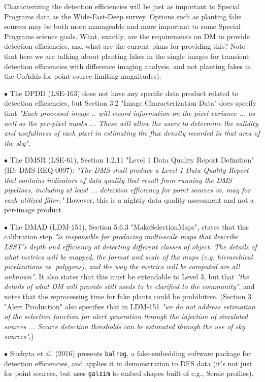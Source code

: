 \documentclass[DM,lsstdraft,toc]{lsstdoc}
\begin{document}
Characterizing the detection efficiencies will be just as important to Special Programs data as the Wide-Fast-Deep survey. Options such as planting fake sources may be both more manageable and more important to some Special Programs science goals. What, exactly, are the requirements on DM to provide detection efficiencies, and what are the current plans for providing this? Note that here we are talking about planting fakes in the single images for transient detection efficiencies with difference imaging analysis, and not planting fakes in the CoAdds for point-source limiting magnitudes).

$\bullet$ The DPDD (LSE-163) does not have any specific data product related to detection efficiencies, but Section 3.2 "Image Characterization Data" does specify that {\it "Each processed image .. will record information on the pixel variance ... as well as the per-pixel masks ... These will allow the users to determine the validity and usefullness of each pixel in estimating the flux density recorded in that area of the sky"}.

$\bullet$ The DMSR (LSE-61), Section 1.2.11 "Level 1 Data Quality Report Definition" (ID: DMS-REQ-0097): {\it "The DMS shall produce a Level 1 Data Quality Report that contains indicators of data quality that result from running the DMS pipelines, including at least ... detection efficiency for point sources vs. mag for each utilized filter."} However, this is a nightly data quality assessment and not a per-image product. 

$\bullet$ The DMAD (LDM-151), Section 5.6.3 "MakeSelectionMaps", states that this calibration step {\it "is responsible for producing multi-scale maps that describe LSST's depth and efficiency at detecting different classes of object. The details of what metrics will be mapped, the format and scale of the maps (e.g. hierarchical pixelizations vs. polygons), and the way the metrics will be computed are all unknown"}. It also states that this must be extendable to Level 3, but that {\it "the details of what DM will provide still needs to be clarified to the community"}, and notes that the reprocessing time for fake plants could be prohibitive. (Section 3 "Alert Production" also specifies that in LDM-151 {\it "we do not address estimation of the selection function for alert generation through the injection of simulated sources ... Source detection thresholds can be estimated through the use of sky sources"}.)

$\bullet$ Suchyta et al. (2016) presents {\tt balrog}, a fake-embedding software package for detection efficiencies, and applies it in demonstration to DES data (it's not just for point sources, but uses {\tt galsim} to embed shapes built of e.g., Sersic profiles).
\end{document}
